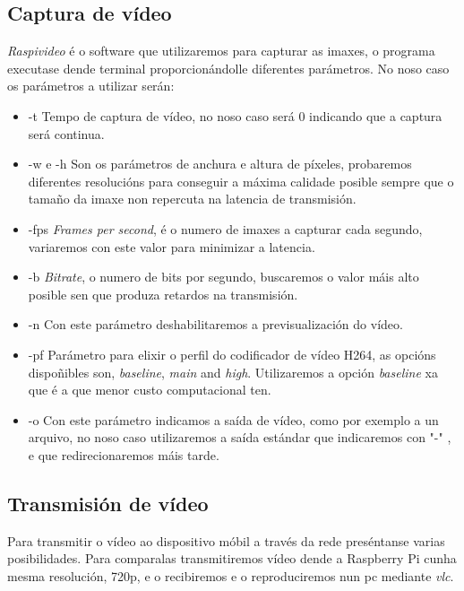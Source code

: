 \subsection{Captura de vídeo}
\emph{Raspivideo} é o software que utilizaremos para capturar as imaxes, o programa executase dende terminal proporcionándolle diferentes parámetros. No noso caso os parámetros a utilizar serán:
\begin{itemize}
    \item -t Tempo de captura de vídeo, no noso caso será 0 indicando que a captura será continua.
    \item -w e -h Son os parámetros de anchura e altura de píxeles, probaremos diferentes resolucións para conseguir a máxima calidade posible sempre que o tamaño da imaxe non repercuta na latencia de transmisión.
    \item -fps \emph{Frames per second}, é o numero de imaxes a capturar cada segundo, variaremos con este valor para minimizar a latencia.
    \item -b \emph{Bitrate}, o numero de bits por segundo, buscaremos o valor máis alto posible sen que produza retardos na transmisión.
    \item -n Con este parámetro deshabilitaremos a previsualización do vídeo.
    \item -pf Parámetro para elixir o perfil do codificador de vídeo H264, as opcións dispoñibles son, \emph{baseline}, \emph{main} and \emph{high}. Utilizaremos a opción \emph{baseline} xa que é a que menor custo computacional ten.
    \item -o Con este parámetro indicamos a saída de vídeo, como por exemplo a un arquivo, no noso caso utilizaremos a saída estándar que indicaremos con "-" , e que redirecionaremos máis tarde.
\end{itemize}
\subsection{Transmisión de vídeo}
Para transmitir o vídeo ao dispositivo móbil a través da rede preséntanse varias posibilidades. Para comparalas transmitiremos vídeo dende a Raspberry Pi cunha mesma resolución, 720p, e o recibiremos e o reproduciremos nun pc mediante \emph{vlc}.

